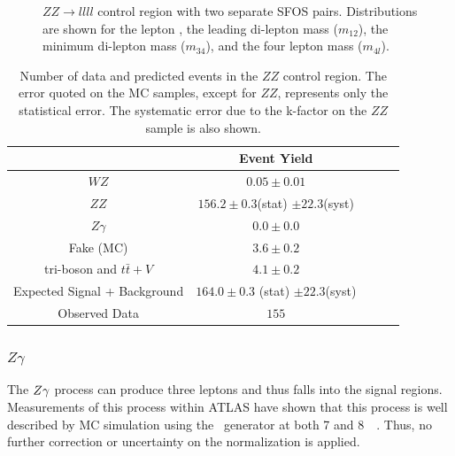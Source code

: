 \begin{figure}[htp]
\caption{$ZZ\rightarrow llll$ control region with two separate SFOS pairs. 
Distributions are shown for the lepton \pt, the leading di-lepton mass ($m_{12}$), 
the minimum di-lepton mass ($m_{34}$), and the four lepton mass ($m_{4l}$).}
\label{fig:ZZ_CR}
\end{figure}  

\begin{table}[htp]
\centering
\begin{tabular}{|c||c|c|c|c|}
\hline
 & Event Yield\\ 
\hline\hline
$WZ$ &  $0.05 \pm 0.01$\\ 
$ZZ$ &  $156.2 \pm 0.3$(stat) $\pm 22.3$(syst) \\ 
$Z\gamma$ &  $0.0 \pm 0.0$\\ 
Fake (MC) &  $3.6 \pm 0.2$\\ 
tri-boson and $t\bar{t}+V$ &  $4.1 \pm 0.2$\\ 
\hline
Expected Signal + Background &  $164.0 \pm 0.3$ (stat) $\pm 22.3$(syst)\\ 
\hline
Observed Data &  $155$\\ %
\hline
\end{tabular}
\caption{Number of data and predicted events in the $ZZ$ control region. 
The error quoted on the MC samples, except for $ZZ$,
represents only the statistical error. 
The systematic error due to the k-factor on the $ZZ$ sample is also shown.}
\label{tab:ZZ_CR}
\end{table}



\subsubsection{$Z\gamma$}
\label{sec:zgammabg}

The $Z\gamma$ process can produce three leptons and thus falls into the 
signal regions.
Measurements of this process within ATLAS
have shown that this process is well described by MC simulation
using the \sherpa~generator at both 7 and 8~\TeV~\cite{Aad:2013izg,Auerbach:1631102}.
Thus, no further correction or uncertainty on the normalization is applied.

